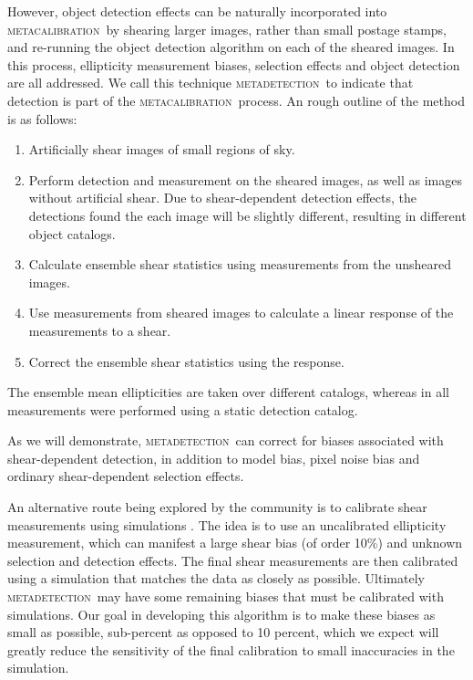 \documentclass[draft, iop, twocolappendix, appendixfloats, numberedappendix, apj]{hackemulateapj}
\newcommand{\mcal}{\textsc{metacalibration}}
\newcommand{\mdet}{\textsc{metadetection}}
\begin{document}
However, object detection
effects can be naturally incorporated into \mcal\ by shearing larger images,
rather than small postage stamps, and re-running the object detection algorithm
on each of the sheared images. In this process, ellipticity measurement biases,
selection effects and object detection are all addressed.  We call this
technique \mdet\ to indicate that detection is part of the \mcal\ process.  An
rough outline of the method is as follows: \begin{enumerate}

    \item Artificially shear images of small regions of sky.

    \item Perform detection and measurement on the sheared images, as well as
        images without artificial shear.  Due to shear-dependent detection
        effects, the detections found the each image will be slightly different,
        resulting in different object catalogs.

    \item Calculate ensemble shear statistics using measurements from the
        unsheared images.

    \item Use measurements from sheared images to calculate a linear response
        of the measurements to a shear.

    \item Correct the ensemble shear statistics using the response.

\end{enumerate}
The ensemble mean ellipticities are taken over different catalogs, whereas in
\cite{SheldonMcal2017} all measurements were performed using a static
detection catalog.  

As we will demonstrate, \mdet\ can correct for biases associated with
shear-dependent detection, in addition to model bias, pixel noise bias
and ordinary shear-dependent selection effects.

An alternative route being explored by the community is to calibrate shear
measurements using simulations \citep[see, e.g.,][]{KIDS450shear,HSCY1shear}.
The idea is to use an uncalibrated ellipticity measurement, which can manifest
a large shear bias (of order 10\%) and  unknown selection and detection
effects.  The final shear measurements are then calibrated using a simulation
that matches the data as closely as possible.  Ultimately \mdet\ may have some
remaining biases that must be calibrated with simulations.  Our goal in
developing this algorithm is to make these biases as small as possible,
sub-percent as opposed to 10 percent, which we expect will greatly reduce the
sensitivity of the final calibration to small inaccuracies in the simulation.
\end{document}
